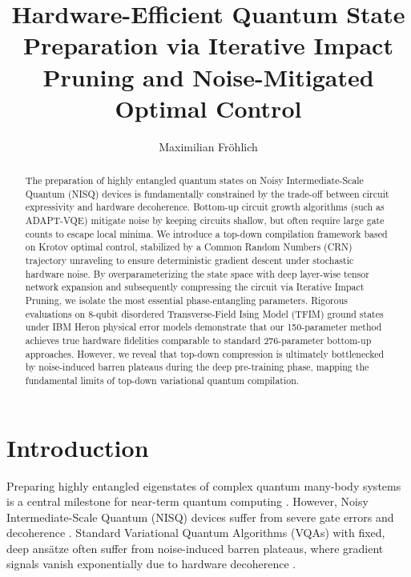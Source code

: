 \documentclass[aps,prl,twocolumn,superscriptaddress,notitlepage]{revtex4-2}
\begin{document}
\title{Hardware-Efficient Quantum State Preparation via Iterative Impact Pruning and Noise-Mitigated Optimal Control}

\author{Maximilian Fr\"ohlich}

\begin{abstract}
The preparation of highly entangled quantum states on Noisy Intermediate-Scale Quantum (NISQ) devices is fundamentally constrained by the trade-off between circuit expressivity and hardware decoherence. Bottom-up circuit growth algorithms (such as ADAPT-VQE) mitigate noise by keeping circuits shallow, but often require large gate counts to escape local minima. We introduce a top-down compilation framework based on Krotov optimal control, stabilized by a Common Random Numbers (CRN) trajectory unraveling to ensure deterministic gradient descent under stochastic hardware noise. By overparameterizing the state space with deep layer-wise tensor network expansion and subsequently compressing the circuit via Iterative Impact Pruning, we isolate the most essential phase-entangling parameters. Rigorous evaluations on 8-qubit disordered Transverse-Field Ising Model (TFIM) ground states under IBM Heron physical error models demonstrate that our 150-parameter method achieves true hardware fidelities comparable to standard 276-parameter bottom-up approaches. However, we reveal that top-down compression is ultimately bottlenecked by noise-induced barren plateaus during the deep pre-training phase, mapping the fundamental limits of top-down variational quantum compilation.
\end{abstract}

\maketitle

\section{Introduction}
Preparing highly entangled eigenstates of complex quantum many-body systems is a central milestone for near-term quantum computing \cite{Preskill2018}. However, Noisy Intermediate-Scale Quantum (NISQ) devices suffer from severe gate errors and decoherence \cite{Arute2019}. Standard Variational Quantum Algorithms (VQAs) with fixed, deep ans\"atze often suffer from noise-induced barren plateaus, where gradient signals vanish exponentially due to hardware decoherence \cite{Wang2021, McClean2018}.
\end{document}
